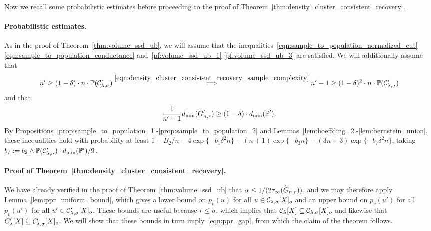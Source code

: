 Now we recall some probabilistic estimates before proceeding to the proof of Theorem~\ref{thm:density_cluster_consistent_recovery}.

\paragraph{Probabilistic estimates.}
As in the proof of Theorem~\ref{thm:volume_ssd_ub}, we will assume that the inequalities~\eqref{eqn:sample_to_population_normalized_cut}-\eqref{eqn:sample_to_population_conductance} and~\eqref{pf:volume_ssd_ub_1}-\eqref{pf:volume_ssd_ub_3} are satisfied. We will additionally assume that
\begin{equation}
n' \geq (1 - \delta) \cdot n \cdot \mathbb{P}(\mathcal{C}_{\lambda,\sigma}') \overset{\eqref{eqn:density_cluster_consistent_recovery_sample_complexity}}{\Longrightarrow} n' - 1 \geq (1 - \delta)^2 \cdot n \cdot \mathbb{P}(\mathcal{C}_{\lambda,\sigma}')
\end{equation}
and that 
\begin{equation}
\frac{1}{n' - 1} d_{\min}(G_{n,r}') \geq (1 - \delta) \cdot d_{\min}(\mathbb{P}').
\end{equation}
By Propositions~\ref{prop:sample_to_population_1}-\ref{prop:sample_to_population_2} and Lemmas~\ref{lem:hoeffding_2}-\ref{lem:bernstein_union}, these inequalities hold with probability at least $1 - B_2/n - 4\exp\{-b_1\delta^2n\} - (n + 1)\exp\{-b_3n\} - (3n + 3)\exp\{-b_7\delta^2n\}$, taking $b_7 := b_2 \wedge \mathbb{P}(\mathcal{C}_{\lambda,\sigma}') \cdot d_{\min}(\mathbb{P}')/9$.

\paragraph{Proof of Theorem~\ref{thm:density_cluster_consistent_recovery}.}
We have already verified in the proof of Theorem~\ref{thm:volume_ssd_ub} that $\alpha \leq 1/(2\tau_{\infty}(\widetilde{G}_{n,r}))$, and we may therefore apply Lemma~\ref{lem:ppr_uniform_bound}, which gives a lower bound on $p_v(u)$ for all $u \in \mathcal{C}_{\lambda,\sigma}[X]_o$ and an upper bound on $p_v(u')$ for all $p_v(u')$ for all $u' \in \mathcal{C}_{\lambda,\sigma}'[X]_o$. These bounds are useful because $r \leq \sigma$, which implies that $\mathcal{C}_{\lambda}[X] \subseteq\mathcal{C}_{\lambda,\sigma}[X]_o$ and likewise that $C_{\lambda}'[X] \subseteq\mathcal{C}_{\lambda,\sigma}'[X]_o$. We will show that these bounds in turn imply~\eqref{eqn:ppr_gap}, from which the claim of the theorem follows.

